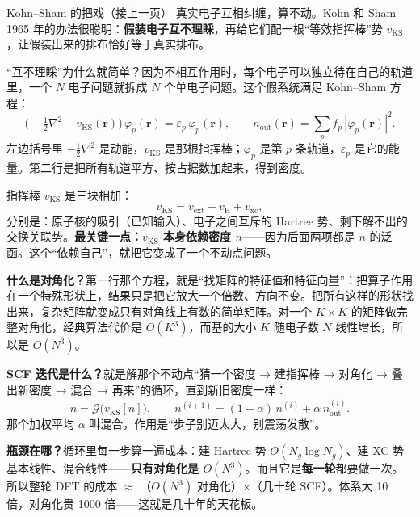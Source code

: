 \documentclass[11pt, a4paper, fontset=none]{ctexart}
\newcommand{\hl}[1]{{\color{key}\bfseries #1}}
\begin{document}
\begin{say}{Kohn–Sham 的把戏（接上一页）}
真实电子互相纠缠，算不动。Kohn 和 Sham 1965 年的办法很聪明：\textbf{假装电子互不理睬}，再给它们配一根“等效指挥棒”势 $v_{\text{KS}}$，让假装出来的排布恰好等于真实排布。

“互不理睬”为什么就简单？因为不相互作用时，每个电子可以独立待在自己的轨道里，一个 $N$ 电子问题就拆成 $N$ 个单电子问题。这个假系统满足 Kohn--Sham 方程：
\begin{equation}
\Big(-\tfrac{1}{2}\nabla^2 + v_{\text{KS}}(\mathbf r)\Big)\,\varphi_p(\mathbf r) = \varepsilon_p\,\varphi_p(\mathbf r),
\qquad
n_{\text{out}}(\mathbf r) = \sum_p f_p\,|\varphi_p(\mathbf r)|^2 .
\end{equation}
左边括号里 $-\frac12\nabla^2$ 是动能，$v_{\text{KS}}$ 是那根指挥棒；$\varphi_p$ 是第 $p$ 条轨道，$\varepsilon_p$ 是它的能量。第二行是把所有轨道平方、按占据数加起来，得到密度。

指挥棒 $v_{\text{KS}}$ 是三块相加：
\begin{equation}
v_{\text{KS}} = v_{\text{ext}} + v_{\text{H}} + v_{\text{xc}},
\end{equation}
分别是：原子核的吸引（已知输入）、电子之间互斥的 Hartree 势、剩下解不出的交换关联势。\textbf{最关键一点：$v_{\text{KS}}$ 本身依赖密度 $n$}——因为后面两项都是 $n$ 的泛函。这个“依赖自己”，就把它变成了一个不动点问题。

\textbf{什么是对角化？}第一行那个方程，就是“找矩阵的特征值和特征向量”：把算子作用在一个特殊形状上，结果只是把它放大一个倍数、方向不变。把所有这样的形状找出来，复杂矩阵就变成只有对角线上有数的简单矩阵。对一个 $K\times K$ 的矩阵做完整对角化，经典算法代价是 $O(K^3)$，而基的大小 $K$ 随电子数 $N$ 线性增长，所以是 \hl{$O(N^3)$}。

\textbf{SCF 迭代是什么？}就是解那个不动点“猜一个密度 → 建指挥棒 → 对角化 → 叠出新密度 → 混合 → 再来”的循环，直到新旧密度一样：
\begin{equation}
n = \mathcal G\big(v_{\text{KS}}[n]\big),
\qquad
n^{(i+1)} = (1-\alpha)\,n^{(i)} + \alpha\, n_{\text{out}}^{(i)} .
\end{equation}
那个加权平均 $\alpha$ 叫混合，作用是“步子别迈太大，别震荡发散”。

\textbf{瓶颈在哪？}循环里每一步算一遍成本：建 Hartree 势 $O(N_g\log N_g)$、建 XC 势基本线性、混合线性——\hl{只有对角化是 $O(N^3)$}。而且它是\textbf{每一轮}都要做一次。所以整轮 DFT 的成本 $\approx$ （$O(N^3)$ 对角化）$\times$（几十轮 SCF）。体系大 10 倍，对角化贵 1000 倍——这就是几十年的天花板。
\end{say}
\end{document}
